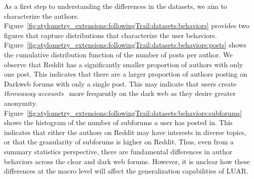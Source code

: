 As a first step to understanding the differences in the datasets, we aim to characterize the authors.
Figure~\ref{fig:stylometry_extensions:followingTrail:datasets:behaviors} provides two figures that capture distributions that characterize the user behaviors.
Figure~\ref{fig:stylometry_extensions:followingTrail:datasets:behaviors:posts} shows the cumulative distribution function of the number of posts per author.
We observe that Reddit has a significantly smaller proportion of authors with only one post.
This indicates that there are a larger proportion of authors posting on Darkweb forums with only a single post.
This may indicate that users create \textit{throwaway accounts}~\cite{leavitt2015throwaway} more frequently on the dark web as they desire greater anonymity.
Figure~\ref{fig:stylometry_extensions:followingTrail:datasets:behaviors:subforums} shows the histogram of the number of subforums a user has posted in.
This indicates that either the authors on Reddit may have interests in diverse topics, or that the granularity of subforums is higher on Reddit.
Thus, even from a summary statistics perspective, there are fundamental differences in author behaviors across the clear and dark web forums.
However, it is unclear how these differences at the macro level will affect the generalization capabilities of LUAR.

